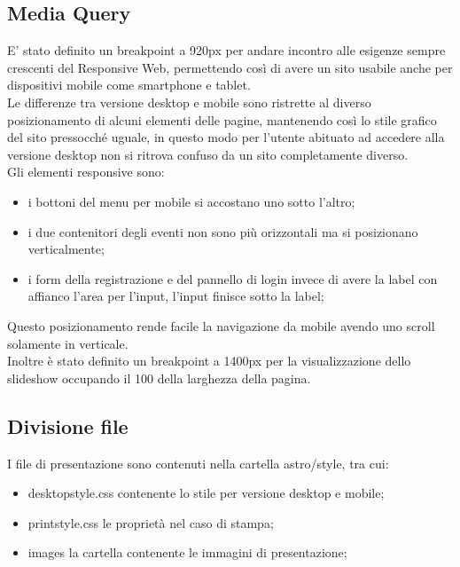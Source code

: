 	\subsection{Media Query}
	E' stato definito un breakpoint a 920px per andare incontro alle esigenze sempre crescenti del Responsive Web, permettendo così di avere un sito usabile anche per dispositivi mobile come smartphone e tablet. \\
	Le differenze tra versione desktop e mobile sono ristrette al diverso posizionamento di alcuni elementi delle pagine, mantenendo così lo stile grafico del sito pressocché uguale, in questo modo per l'utente abituato ad accedere alla versione desktop non si ritrova confuso da un sito completamente diverso. \\
	Gli elementi responsive sono:
	\begin{itemize}
		\item i bottoni del menu per mobile si accostano uno sotto l'altro;
		\item i due contenitori degli eventi non sono più orizzontali ma si posizionano verticalmente;
		\item i form della registrazione e del pannello di login invece di avere la label con affianco l'area per l'input, l'input finisce sotto la label;
	\end{itemize}  
	Questo posizionamento rende facile la navigazione da mobile avendo uno scroll solamente in verticale. \\
	Inoltre è stato definito un breakpoint a 1400px per la visualizzazione dello slideshow occupando il 100 della larghezza della pagina.
	\subsection{Divisione file}
	I file di presentazione sono contenuti nella cartella astro/style, tra cui:
	\begin{itemize}
		\item desktopstyle.css contenente lo stile per versione desktop e mobile;
		\item printstyle.css le proprietà nel caso di stampa;
		\item images la cartella contenente le immagini di presentazione;
	\end{itemize}
